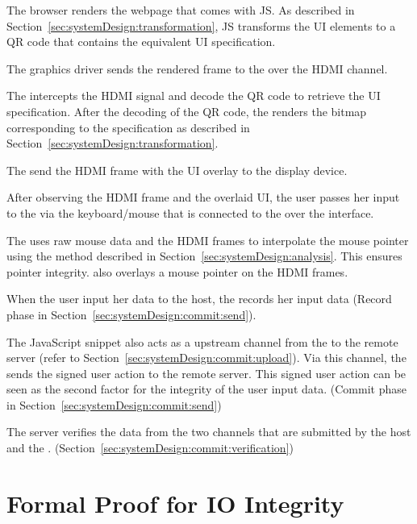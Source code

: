 \begin{mylist}
  \item[\one] The browser renders the webpage that comes with \name JS. As described in Section~\ref{sec:systemDesign:transformation}, \name JS transforms the UI elements to a QR code that contains the equivalent UI specification.
  \item[\two] The graphics driver sends the rendered frame to the \device over the HDMI channel.
  \item[\three] The \device intercepts the HDMI signal and decode the QR code to retrieve the UI specification. After the decoding of the QR code, the \device renders the bitmap corresponding to the specification as described in Section~\ref{sec:systemDesign:transformation}.
  \item[\four] The \device send the HDMI frame with the UI overlay to the display device.
  \item[\five] After observing the HDMI frame and the overlaid UI, the user passes her input to the \device via the keyboard/mouse that is connected to the \device over the \usb interface.
  \item[\six] The \device uses raw mouse data and the HDMI frames to interpolate the mouse pointer using the method described in Section~\ref{sec:systemDesign:analysis}. This ensures pointer integrity. \device also overlays a mouse pointer on the HDMI frames.
  \item[\seven] When the user input her data to the host, the \device records her input data (Record phase in Section~\ref{sec:systemDesign:commit:send}).
  \item[\eight] The \name JavaScript snippet also acts as a upstream channel from the \device to the remote server (refer to Section~\ref{sec:systemDesign:commit:upload}). Via this channel, the \device sends the signed user action to the remote server. This signed user action can be seen as the second factor for the integrity of the user input data. (Commit phase in Section~\ref{sec:systemDesign:commit:send})
  \item [\nine] The server verifies the data from the two channels that are submitted by the host and the \device. (Section~\ref{sec:systemDesign:commit:verification})
\end{mylist}


\section*{Formal Proof for IO Integrity}
\label{appendix:security}

